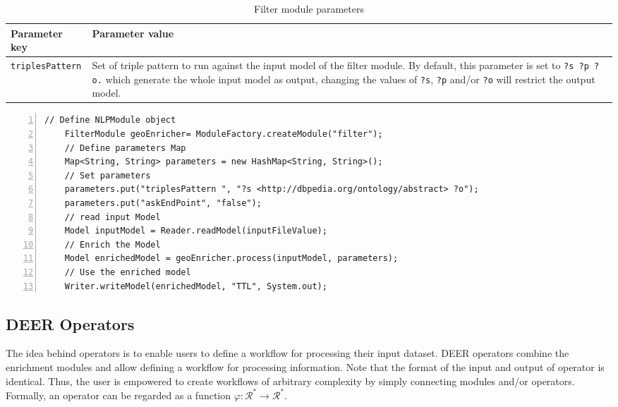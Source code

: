 \documentclass[a4paper,twoside,bibtotoc,abstracton,12pt,BCOR=15mm]{article}
\newcommand{\geolift}{\textsc{DEER}\xspace}
\begin{document}
    \begin{table}
    \caption{Filter module parameters} \label{tbl:filterPram}
    \small
    \begin{tabularx}{\textwidth}{@{}lX@{}}
    \toprule
    \textbf{Parameter key} 	& \textbf{Parameter value} \\
    \toprule
    \texttt{triplesPattern}	& Set of triple pattern to run against the input model of the filter module. By default, this parameter is set to \texttt{?s ?p ?o.} which generate the whole input model as output, changing the values of \texttt{?s}, \texttt{?p} and/or \texttt{?o} will restrict the output model.\\
    \bottomrule
    \end{tabularx}
    \end{table}
    
    \begin{lstlisting}[label=lst:filterModule, float=tp, numbers=left, numberstyle=\tiny, caption = Code fragment to call the \texttt{FilterModule} class.]
    // Define NLPModule object
    FilterModule geoEnricher= ModuleFactory.createModule("filter");
    // Define parameters Map
    Map<String, String> parameters = new HashMap<String, String>();
    // Set parameters
    parameters.put("triplesPattern ", "?s <http://dbpedia.org/ontology/abstract> ?o");
    parameters.put("askEndPoint", "false");
    // read input Model
    Model inputModel = Reader.readModel(inputFileValue);
    // Enrich the Model
    Model enrichedModel = geoEnricher.process(inputModel, parameters);
    // Use the enriched model
    Writer.writeModel(enrichedModel, "TTL", System.out);
    \end{lstlisting}
    
\subsection{\geolift Operators}
The idea behind operators is to enable users to define a workflow for processing their input dataset. 
\geolift operators combine the enrichment modules and allow defining a workflow for processing information.
Note that the format of the input and output of operator is identical. 
Thus, the user is empowered to create workflows of arbitrary complexity by simply connecting modules and/or operators.
Formally, an operator can be regarded as a function $\varphi: \mathcal{R}^* \rightarrow \mathcal{R}^*$.
\end{document}
